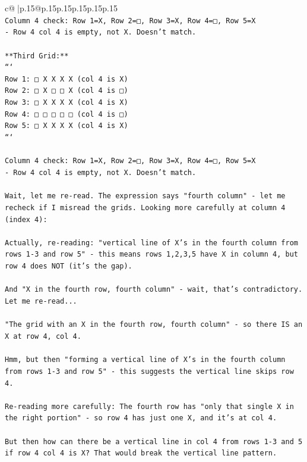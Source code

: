 \documentclass{article}
\begin{document}
{\begin{supertabular}{c@{$\;$}|p{.15\linewidth}@{}p{.15\linewidth}p{.15\linewidth}p{.15\linewidth}p{.15\linewidth}p{.15\linewidth}}
{{{\\ 
\texttt{Column 4 check: Row 1=X, Row 2=□, Row 3=X, Row 4=□, Row 5=X} \\
\texttt{{-} Row 4 col 4 is empty, not X. Doesn't match.} \\
\\ 
\texttt{**Third Grid:**} \\
\texttt{```} \\
\texttt{Row 1: □ X X X X  (col 4 is X)} \\
\texttt{Row 2: □ X □ □ X  (col 4 is □)} \\
\texttt{Row 3: □ X X X X  (col 4 is X)} \\
\texttt{Row 4: □ □ □ □ □  (col 4 is □)} \\
\texttt{Row 5: □ X X X X  (col 4 is X)} \\
\texttt{```} \\
\\ 
\texttt{Column 4 check: Row 1=X, Row 2=□, Row 3=X, Row 4=□, Row 5=X} \\
\texttt{{-} Row 4 col 4 is empty, not X. Doesn't match.} \\
\\ 
\texttt{Wait, let me re{-}read. The expression says "fourth column" {-} let me recheck if I misread the grids. Looking more carefully at column 4 (index 4):} \\
\\ 
\texttt{Actually, re{-}reading: "vertical line of X's in the fourth column from rows 1{-}3 and row 5" {-} this means rows 1,2,3,5 have X in column 4, but row 4 does NOT (it's the gap).} \\
\\ 
\texttt{And "X in the fourth row, fourth column" {-} wait, that's contradictory. Let me re{-}read...} \\
\\ 
\texttt{"The grid with an X in the fourth row, fourth column" {-} so there IS an X at row 4, col 4.} \\
\\ 
\texttt{Hmm, but then "forming a vertical line of X's in the fourth column from rows 1{-}3 and row 5" {-} this suggests the vertical line skips row 4.} \\
\\ 
\texttt{Re{-}reading more carefully: The fourth row has "only that single X in the right portion" {-} so row 4 has just one X, and it's at col 4.} \\
\\ 
\texttt{But then how can there be a vertical line in col 4 from rows 1{-}3 and 5 if row 4 col 4 is X? That would break the vertical line pattern.} \\
}}}
\end{supertabular}}
\end{document}

